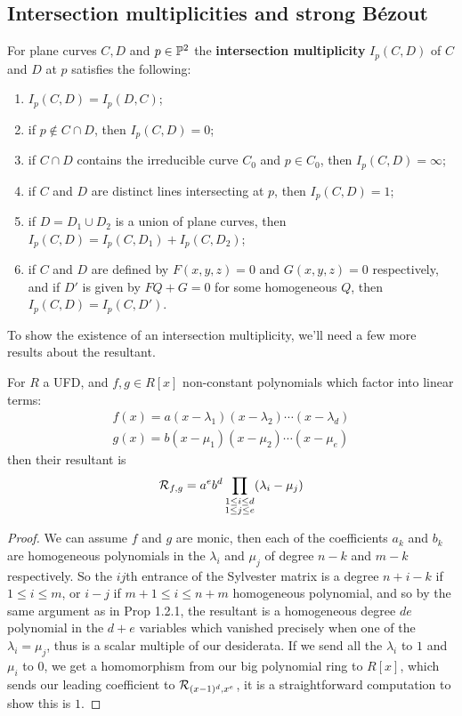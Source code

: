 \documentclass{article}
\begin{document}
\subsection{Intersection multiplicities and strong B\'ezout}

\begin{definition}
    For plane curves $C,D$ and $p\in \mathbb{P}^2$ the \textbf{intersection multiplicity} $I_p(C,D)$ of $C$ and $D$ at $p$ satisfies the following: \begin{enumerate}
        \item $I_p(C,D) = I_p(D,C)$;
        \item if $p\not\in C\cap D$, then $I_p(C,D)=0$;
        \item if $C\cap D$ contains the irreducible curve $C_0$ and $p\in C_0$, then $I_p(C,D)=\infty$;
        \item if $C$ and $D$ are distinct lines intersecting at $p$, then $I_p(C,D)=1$;
        \item if $D=D_1\cup D_2$ is a union of plane curves, then $I_p(C,D) = I_p(C,D_1) + I_p(C,D_2)$;
        \item if $C$ and $D$ are defined by $F(x,y,z)=0$ and $G(x,y,z)=0$ respectively, and if $D'$ is given by $FQ + G = 0$ for some homogeneous $Q$, then $I_p(C,D) = I_p(C,D')$.
    \end{enumerate}
\end{definition}

To show the existence of an intersection multiplicity, we'll need a few more results about the resultant.

\begin{proposition}
    For $R$ a UFD, and $f,g\in R[x]$ non-constant polynomials which factor into linear terms: \begin{gather*}
        f(x) = a(x-\lambda_1)(x-\lambda_2)\cdots(x-\lambda_d) \\
        g(x) = b(x-\mu_1)(x-\mu_2)\cdots(x-\mu_e)
    \end{gather*} then their resultant is \[
    \mathcal{R}_{f,g} = a^eb^d\prod_{\substack{1\leq i\leq d \\ 1\leq j \leq e}}(\lambda_i - \mu_j)
    \]\begin{proof}
        We can assume $f$ and $g$ are monic, then each of the coefficients $a_k$ and $b_k$ are homogeneous polynomials in the $\lambda_i$ and $\mu_j$ of degree $n-k$ and $m-k$ respectively. So the $ij$th entrance of the Sylvester matrix is a degree $n+i-k$ if $1\leq i\leq m$, or $i-j$ if $m+1\leq i \leq n+m$ homogeneous polynomial, and so by the same argument as in Prop 1.2.1, the resultant is a homogeneous degree $de$ polynomial in the $d+e$ variables which vanished precisely when one of the $\lambda_i=\mu_j$, thus is a scalar multiple of our desiderata. If we send all the $\lambda_i$ to $1$ and $\mu_i$ to $0$, we get a homomorphism from our big polynomial ring to $R[x]$, which sends our leading coefficient to $\mathcal{R}_{(x-1)^d,x^e}$, it is a straightforward computation to show this is $1$.
    \end{proof}
\end{proposition}
\end{document}
